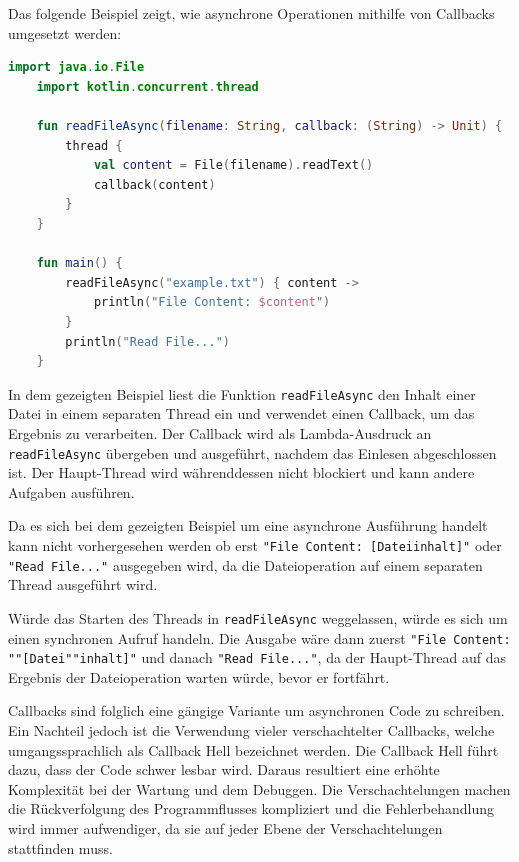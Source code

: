 \documentclass[fontsize=12pt,paper=a4,twoside=semi,parskip=half-,headsepline,headinclude]{scrreprt}
\begin{document}
Das folgende Beispiel zeigt, wie asynchrone Operationen mithilfe von Callbacks umgesetzt werden:

\begin{lstlisting}[language=Kotlin]
	import java.io.File
	import kotlin.concurrent.thread
	
	fun readFileAsync(filename: String, callback: (String) -> Unit) {
		thread {
			val content = File(filename).readText()
			callback(content)
		}
	}
	
	fun main() {
		readFileAsync("example.txt") { content ->
			println("File Content: $content")
		}
		println("Read File...")
	}
\end{lstlisting}

In dem gezeigten Beispiel liest die Funktion \texttt{readFileAsync} den Inhalt einer Datei in einem separaten Thread ein und verwendet einen Callback, um das Ergebnis zu verarbeiten. Der Callback wird als Lambda-Ausdruck an \texttt{readFileAsync} übergeben und ausgeführt, nachdem das Einlesen abgeschlossen ist. Der Haupt-Thread wird währenddessen nicht blockiert und kann andere Aufgaben ausführen.

Da es sich bei dem gezeigten Beispiel um eine asynchrone Ausführung handelt kann nicht vorhergesehen werden ob erst \texttt{"File Content: [Dateiinhalt]"} oder \texttt{"Read File..."} ausgegeben wird, da die Dateioperation auf einem separaten Thread ausgeführt wird.

Würde das Starten des Threads in \texttt{readFileAsync} weggelassen, würde es sich um einen synchronen Aufruf handeln. Die Ausgabe wäre dann zuerst \texttt{"File Content: ""[Datei""inhalt]"} und danach \texttt{"Read File..."}, da der Haupt-Thread auf das Ergebnis der Dateioperation warten würde, bevor er fortfährt.

Callbacks sind folglich eine gängige Variante um asynchronen Code zu schreiben. Ein Nachteil jedoch ist die Verwendung vieler verschachtelter Callbacks, welche umgangssprachlich als Callback Hell bezeichnet werden\cite{Leger2021}. Die Callback Hell führt dazu, dass der Code schwer lesbar wird. Daraus resultiert eine erhöhte Komplexität bei der Wartung und dem Debuggen. Die Verschachtelungen machen die Rückverfolgung des Programmflusses kompliziert und  die Fehlerbehandlung wird immer aufwendiger, da sie auf jeder Ebene der Verschachtelungen stattfinden muss.
\end{document}
